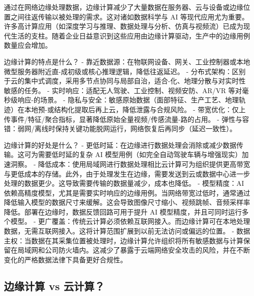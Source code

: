 通过在网络边缘处理数据，边缘计算减少了大量数据在服务器、云与设备或边缘位置之间往返传输以被处理的需求。这对诸如数据科学与
AI
等现代应用尤为重要。许多高计算应用（如深度学习与推理、数据处理与分析、仿真与视频流）已成为现代生活的支柱。随着企业日益意识到这些应用由边缘计算驱动，生产中的边缘用例数量应会增加。

边缘计算的特点是什么？ -
靠近数据源：在物联网设备、网关、工业控制器或本地微型服务器附近直-成初级或核心推理逻辑，降低往返延迟。
-
分布式架构：区别于云的集中式调度，采用多节点协同与局部自治，适合-化、地理分散与对实时性敏感的任务。
- 实时响应：适配无人驾驶、工业控制、视频安防、AR/VR
等对毫秒级响应-的场景。 -
隐私与安全：敏感原始数据（面部特征、生产工艺、地理轨迹）在本地预-或结构化提取后再上云，降低泄露与合规风险。
-
带宽优化：仅上传事件/特征/聚合指标，显著降低原始全量视频/传感流量-路的占用。
-
弹性与容错：弱网/离线时保持关键功能脱网运行，网络恢复后再同步（延迟一致性）。

边缘计算的好处是什么？ -
更低时延：在边缘进行数据处理会消除或减少数据传输。这可为需要低时延的复杂
AI 模型用例（如完全自动驾驶车辆与增强现实）加速洞察。 -
降低成本：使用局域网进行数据处理相比云计算可为组织提供更高带宽与更低成本的存储。此外，由于处理发生在边缘，需要发送到云或数据中心进一步处理的数据更少。这导致需要传输的数据量减少，成本也降低。
- 模型精度：AI
依赖高精度模型，尤其是需要实时响应的边缘用例。当网络带宽过低时，通常通过降低输入模型的数据尺寸来缓解。这会导致图像尺寸缩小、视频跳帧、音频采样率降低。部署在边缘时，数据反馈回路可用于提升
AI 模型精度，并且可同时运行多个模型。 -
更广覆盖：传统云计算必须依赖互联网接入。而边缘计算可在本地处理数据，无需互联网接入。这将计算范围扩展到以前无法访问或偏远的位置。
-
数据主权：当数据在其采集位置被处理时，边缘计算允许组织将所有敏感数据与计算保留在局域网和公司防火墙内。这减少了暴露于云端网络安全攻击的风险，并在不断变化的严格数据法律下具备更好合规性。

\subsection{边缘计算 vs 云计算？}\label{src-book-chapter1-h4}

